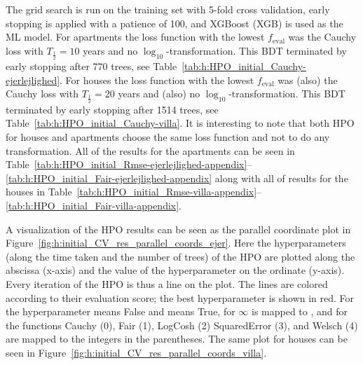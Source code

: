 The grid search is run on the training set with \num{5}-fold cross validation, early stopping is applied with a patience of \num{100}, and XGBoost \autocite{chenXGBoostScalableTree2016} (XGB) is used as the ML model. For apartments the loss function with the lowest $f_\mathrm{eval}$ was the Cauchy loss with $T_{\frac{1}{2}}=10$ years and no $\log_{10}$-transformation. This BDT terminated by early stopping after \num{770} trees, see Table~\ref{tab:h:HPO_initial_Cauchy-ejerlejlighed}. 
For houses the loss function with the lowest $f_\mathrm{eval}$ was (also) the Cauchy loss with $T_{\frac{1}{2}}=20$ years and (also) no $\log_{10}$-transformation. This BDT terminated by early stopping after \num{1514} trees, see Table~\ref{tab:h:HPO_initial_Cauchy-villa}. 
It is interesting to note that both HPO for houses and apartments choose the same loss function and not to do any transformation. All of the results for the apartments can be seen in Table~\ref{tab:h:HPO_initial_Rmse-ejerlejlighed-appendix}--\ref{tab:h:HPO_initial_Fair-ejerlejlighed-appendix} along with all of results for the houses in Table~\ref{tab:h:HPO_initial_Rmse-villa-appendix}--\ref{tab:h:HPO_initial_Fair-villa-appendix}. 

A visualization of the HPO results can be seen as the parallel coordinate plot in Figure~\ref{fig:h:initial_CV_res_parallel_coords_ejer}. Here the hyperparameters (along the time taken and the number of trees) of the HPO are plotted along the abscissa (x-axis) and the value of the hyperparameter on the ordinate (y-axis). Every iteration of the HPO is thus a line on the plot. The lines are colored according to their evaluation score; the best hyperparameter is shown in red. For the hyperparameter   means False and  means True, for  $\infty$ is mapped to , and for  the functions Cauchy (0), Fair (1), LogCosh (2) SquaredError (3), and Welsch (4) are mapped to the integers in the parentheses. The same plot for houses can be seen in Figure~\ref{fig:h:initial_CV_res_parallel_coords_villa}.

